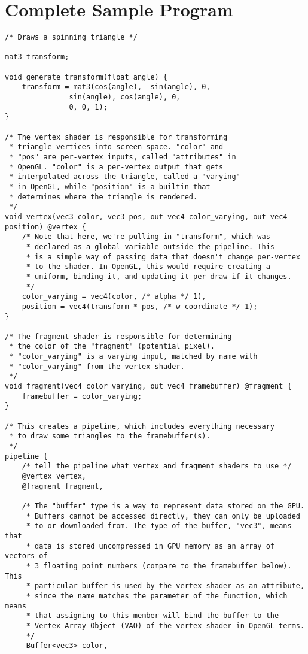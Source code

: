 \documentclass[11pt]{article}
\begin{document}

\section{Complete Sample Program}

\begin{lstlisting}
/* Draws a spinning triangle */

mat3 transform;

void generate_transform(float angle) {
    transform = mat3(cos(angle), -sin(angle), 0,
               sin(angle), cos(angle), 0,
               0, 0, 1);
}

/* The vertex shader is responsible for transforming
 * triangle vertices into screen space. "color" and
 * "pos" are per-vertex inputs, called "attributes" in
 * OpenGL. "color" is a per-vertex output that gets
 * interpolated across the triangle, called a "varying"
 * in OpenGL, while "position" is a builtin that 
 * determines where the triangle is rendered.
 */
void vertex(vec3 color, vec3 pos, out vec4 color_varying, out vec4 position) @vertex {
    /* Note that here, we're pulling in "transform", which was
     * declared as a global variable outside the pipeline. This
     * is a simple way of passing data that doesn't change per-vertex
     * to the shader. In OpenGL, this would require creating a
     * uniform, binding it, and updating it per-draw if it changes.
     */
    color_varying = vec4(color, /* alpha */ 1),
   	position = vec4(transform * pos, /* w coordinate */ 1);
}

/* The fragment shader is responsible for determining
 * the color of the "fragment" (potential pixel).
 * "color_varying" is a varying input, matched by name with
 * "color_varying" from the vertex shader.
 */
void fragment(vec4 color_varying, out vec4 framebuffer) @fragment {
    framebuffer = color_varying;
}

/* This creates a pipeline, which includes everything necessary
 * to draw some triangles to the framebuffer(s).
 */
pipeline {
    /* tell the pipeline what vertex and fragment shaders to use */
    @vertex vertex,
    @fragment fragment,
    
    /* The "buffer" type is a way to represent data stored on the GPU.
     * Buffers cannot be accessed directly, they can only be uploaded
     * to or downloaded from. The type of the buffer, "vec3", means that
     * data is stored uncompressed in GPU memory as an array of vectors of
     * 3 floating point numbers (compare to the framebuffer below). This
     * particular buffer is used by the vertex shader as an attribute,
     * since the name matches the parameter of the function, which means
     * that assigning to this member will bind the buffer to the
     * Vertex Array Object (VAO) of the vertex shader in OpenGL terms.
     */
     Buffer<vec3> color,
     

\end{lstlisting}
\end{document}
